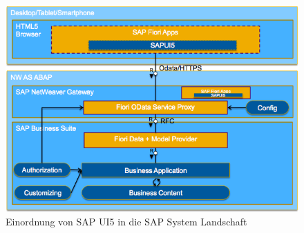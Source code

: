 \vspace{1em}
\begin{figure}[htb]
  \centering
  \includegraphics[width=0.8\linewidth]{abb/sap_ui5_architecture}
  \caption[Einordnung von SAP UI5 in die SAP System Landschaft]{Einordnung von SAP UI5 in die SAP System Landschaft \cite{SAPFIORIARCH}}
  \label{fig:sapui5arch}
\end{figure}